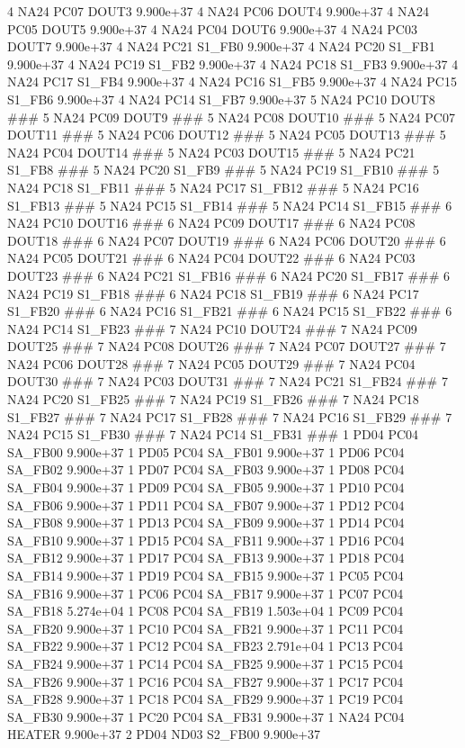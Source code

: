 4 NA24 PC07 DOUT3 9.900e+37 
4 NA24 PC06 DOUT4 9.900e+37 
4 NA24 PC05 DOUT5 9.900e+37 
4 NA24 PC04 DOUT6 9.900e+37 
4 NA24 PC03 DOUT7 9.900e+37 
4 NA24 PC21 S1_FB0 9.900e+37 
4 NA24 PC20 S1_FB1 9.900e+37 
4 NA24 PC19 S1_FB2 9.900e+37 
4 NA24 PC18 S1_FB3 9.900e+37 
4 NA24 PC17 S1_FB4 9.900e+37 
4 NA24 PC16 S1_FB5 9.900e+37 
4 NA24 PC15 S1_FB6 9.900e+37 
4 NA24 PC14 S1_FB7 9.900e+37 
5 NA24 PC10 DOUT8 ### 
5 NA24 PC09 DOUT9 ### 
5 NA24 PC08 DOUT10 ### 
5 NA24 PC07 DOUT11 ### 
5 NA24 PC06 DOUT12 ### 
5 NA24 PC05 DOUT13 ### 
5 NA24 PC04 DOUT14 ### 
5 NA24 PC03 DOUT15 ### 
5 NA24 PC21 S1_FB8 ### 
5 NA24 PC20 S1_FB9 ### 
5 NA24 PC19 S1_FB10 ### 
5 NA24 PC18 S1_FB11 ### 
5 NA24 PC17 S1_FB12 ### 
5 NA24 PC16 S1_FB13 ### 
5 NA24 PC15 S1_FB14 ### 
5 NA24 PC14 S1_FB15 ### 
6 NA24 PC10 DOUT16 ### 
6 NA24 PC09 DOUT17 ### 
6 NA24 PC08 DOUT18 ### 
6 NA24 PC07 DOUT19 ### 
6 NA24 PC06 DOUT20 ### 
6 NA24 PC05 DOUT21 ### 
6 NA24 PC04 DOUT22 ### 
6 NA24 PC03 DOUT23 ### 
6 NA24 PC21 S1_FB16 ### 
6 NA24 PC20 S1_FB17 ### 
6 NA24 PC19 S1_FB18 ### 
6 NA24 PC18 S1_FB19 ### 
6 NA24 PC17 S1_FB20 ### 
6 NA24 PC16 S1_FB21 ### 
6 NA24 PC15 S1_FB22 ### 
6 NA24 PC14 S1_FB23 ### 
7 NA24 PC10 DOUT24 ### 
7 NA24 PC09 DOUT25 ### 
7 NA24 PC08 DOUT26 ### 
7 NA24 PC07 DOUT27 ### 
7 NA24 PC06 DOUT28 ### 
7 NA24 PC05 DOUT29 ### 
7 NA24 PC04 DOUT30 ### 
7 NA24 PC03 DOUT31 ### 
7 NA24 PC21 S1_FB24 ### 
7 NA24 PC20 S1_FB25 ### 
7 NA24 PC19 S1_FB26 ### 
7 NA24 PC18 S1_FB27 ### 
7 NA24 PC17 S1_FB28 ### 
7 NA24 PC16 S1_FB29 ### 
7 NA24 PC15 S1_FB30 ### 
7 NA24 PC14 S1_FB31 ### 
1 PD04 PC04 SA_FB00 9.900e+37 
1 PD05 PC04 SA_FB01 9.900e+37 
1 PD06 PC04 SA_FB02 9.900e+37 
1 PD07 PC04 SA_FB03 9.900e+37 
1 PD08 PC04 SA_FB04 9.900e+37 
1 PD09 PC04 SA_FB05 9.900e+37 
1 PD10 PC04 SA_FB06 9.900e+37 
1 PD11 PC04 SA_FB07 9.900e+37 
1 PD12 PC04 SA_FB08 9.900e+37 
1 PD13 PC04 SA_FB09 9.900e+37 
1 PD14 PC04 SA_FB10 9.900e+37 
1 PD15 PC04 SA_FB11 9.900e+37 
1 PD16 PC04 SA_FB12 9.900e+37 
1 PD17 PC04 SA_FB13 9.900e+37 
1 PD18 PC04 SA_FB14 9.900e+37 
1 PD19 PC04 SA_FB15 9.900e+37 
1 PC05 PC04 SA_FB16 9.900e+37 
1 PC06 PC04 SA_FB17 9.900e+37 
1 PC07 PC04 SA_FB18 5.274e+04 
1 PC08 PC04 SA_FB19 1.503e+04 
1 PC09 PC04 SA_FB20 9.900e+37 
1 PC10 PC04 SA_FB21 9.900e+37 
1 PC11 PC04 SA_FB22 9.900e+37 
1 PC12 PC04 SA_FB23 2.791e+04 
1 PC13 PC04 SA_FB24 9.900e+37 
1 PC14 PC04 SA_FB25 9.900e+37 
1 PC15 PC04 SA_FB26 9.900e+37 
1 PC16 PC04 SA_FB27 9.900e+37 
1 PC17 PC04 SA_FB28 9.900e+37 
1 PC18 PC04 SA_FB29 9.900e+37 
1 PC19 PC04 SA_FB30 9.900e+37 
1 PC20 PC04 SA_FB31 9.900e+37 
1 NA24 PC04 HEATER 9.900e+37 
2 PD04 ND03 S2_FB00 9.900e+37 

